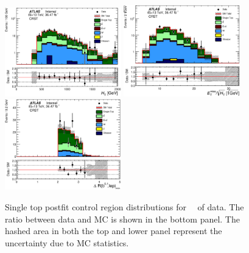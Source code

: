 \begin{figure}[htbp]
\begin{center}
\includegraphics[width=0.45\textwidth]{figures/singleTop/postfit/Ht_CRST_log.eps}
\includegraphics[width=0.45\textwidth]{figures/singleTop/postfit/HtSig_CRST_log.eps}
\includegraphics[width=0.45\textwidth]{figures/singleTop/postfit/MinDRBLep_CRST.eps}
\end{center}
\caption{Single top postfit control region distributions for \intlumi\ \ifb\ of data. The ratio between data and MC is shown in the bottom panel. The hashed area in both the top and lower panel represent the uncertainty due to MC statistics.}
\label{fig:CRST}
\end{figure}

